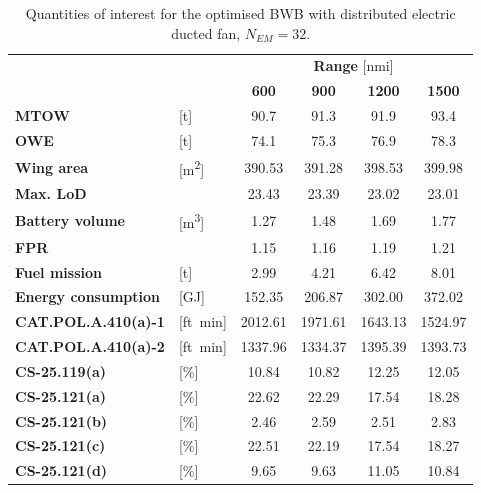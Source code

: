 \begin{table}[!h]
	\centering
	\begin{tabular}{l l c c c c}
		\cline{3-6}
		& & \multicolumn{4}{c}{\textbf{Range} [nmi]} \\
		& & \textbf{600} & \textbf{900} & \textbf{1200} & \textbf{1500} \\
		\hline
		\textbf{MTOW} & [\si{\tonne}] & 90.7 & 91.3 & 91.9 & 93.4 \\
		\textbf{OWE} & [\si{\tonne}] & 74.1 & 75.3 & 76.9 & 78.3 \\
		\textbf{Wing area} & [\si{\square\meter}] & 390.53 & 391.28 & 398.53 & 399.98 \\
		\textbf{Max. LoD} & & 23.43 & 23.39 & 23.02 & 23.01 \\
		\textbf{Battery volume} & [\si{\cubic\meter}] & 1.27 & 1.48 & 1.69 & 1.77 \\
		\textbf{FPR} & & 1.15 & 1.16 & 1.19 & 1.21 \\
		\textbf{Fuel mission} & [\si{\tonne}] & 2.99 & 4.21 & 6.42 & 8.01 \\
		\textbf{Energy consumption} & [\si{\giga\joule}] & 152.35 & 206.87 & 302.00 & 372.02 \\
		\hline
		\textbf{CAT.POL.A.410(a)-1} & [ft\si{\per\minute}] & 2012.61 & 1971.61 & 1643.13 & 1524.97 \\
		\textbf{CAT.POL.A.410(a)-2} & [ft\si{\per\minute}] & 1337.96 & 1334.37 & 1395.39 & 1393.73 \\
		\textbf{CS-25.119(a)} & [\%] & 10.84 & 10.82 & 12.25 & 12.05 \\
		\textbf{CS-25.121(a)} & [\%] & 22.62 & 22.29 & 17.54 & 18.28 \\
		\textbf{CS-25.121(b)} & [\%] & 2.46 & 2.59 & 2.51 & 2.83 \\
		\textbf{CS-25.121(c)} & [\%] & 22.51 & 22.19 & 17.54 & 18.27 \\
		\textbf{CS-25.121(d)} & [\%] & 9.65 & 9.63 & 11.05 & 10.84 \\
		\hline
	\end{tabular}
	\caption{Quantities of interest for the optimised BWB with distributed electric ducted fan, $N_{EM}=32$.}
	\label{tab:bwb_hybrid_dep_optim_res_n32}
\end{table}
